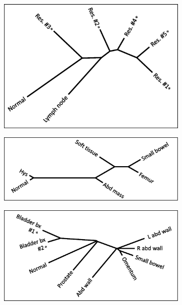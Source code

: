 \begin{figure}[htp]
\begin{subfigure}{0.49\textwidth}
		\caption{}\label{fig:msiclones:NJ_trees_3}
	\end{subfigure}%
	\hfill%
	\begin{subfigure}{0.49\textwidth}
		\includegraphics[width=\linewidth,keepaspectratio]{images/msiclones/supp_nj_4}
		\caption{}\label{fig:msiclones:NJ_trees_4}
	\end{subfigure}
	\par
	\begin{subfigure}{0.49\textwidth}
		\includegraphics[width=\linewidth,keepaspectratio]{images/msiclones/supp_nj_5}
		\caption{}\label{fig:msiclones:NJ_trees_5}
	\end{subfigure}%
	\hfill%
	\begin{subfigure}{0.49\textwidth}
		\includegraphics[width=\linewidth,keepaspectratio]{images/msiclones/supp_nj_6}

\end{subfigure}
\end{figure}
